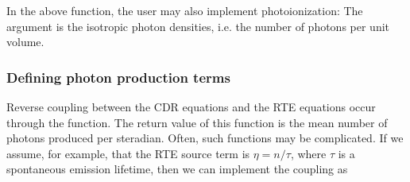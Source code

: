\documentclass[letterpaper,10pt,english]{sphinxmanual}
\begin{document}
\begin{sphinxVerbatim}[commandchars=\\\{\},formatcom=\scriptsize]
                
                                                
                                                
                                                
                                            
                                            
                                          
     
   \PYG{p}{[}\PYG{p}{]}  \PYG{p}{[}\PYG{p}{]}\PYG{p}{[}\PYG{p}{]}
    
\end{sphinxVerbatim}

In the above function, the user may also implement photoionization: The argument  is the isotropic photon densities, i.e. the number of photons per unit volume.


\subsubsection{Defining photon production terms}
\label{\detokenize{MinimalPlasmaModel:defining-photon-production-terms}}
Reverse coupling between the CDR equations and the RTE equations occur through the  function. The return value of this function is the mean number of photons produced per steradian. Often, such functions may be complicated. If we assume, for example, that the RTE source term is \(\eta = n/\tau\), where \(\tau\) is a spontaneous emission lifetime, then we can implement the coupling as
\end{document}
